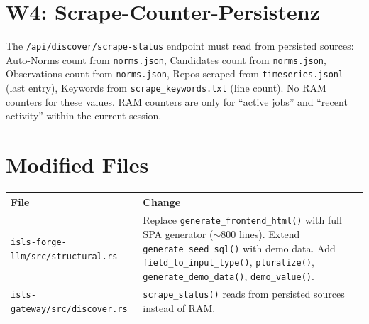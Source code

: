 \documentclass[11pt,a4paper]{article}
\begin{document}
\section{W4: Scrape-Counter-Persistenz}
The \texttt{/api/discover/scrape-status} endpoint must read from persisted sources: Auto-Norms count from \texttt{norms.json}, Candidates count from \texttt{norms.json}, Observations count from \texttt{norms.json}, Repos scraped from \texttt{timeseries.jsonl} (last entry), Keywords from \texttt{scrape\_keywords.txt} (line count). No RAM counters for these values. RAM counters are only for ``active jobs'' and ``recent activity'' within the current session.

\section{Modified Files}
\begin{longtable}{lp{10cm}}
\toprule
\textbf{File} & \textbf{Change} \\
\midrule
\texttt{isls-forge-llm/src/structural.rs} & Replace \texttt{generate\_frontend\_html()} with full SPA generator ($\sim$800 lines). Extend \texttt{generate\_seed\_sql()} with demo data. Add \texttt{field\_to\_input\_type()}, \texttt{pluralize()}, \texttt{generate\_demo\_data()}, \texttt{demo\_value()}. \\
\texttt{isls-gateway/src/discover.rs} & \texttt{scrape\_status()} reads from persisted sources instead of RAM. \\
\bottomrule
\end{longtable}
\end{document}
